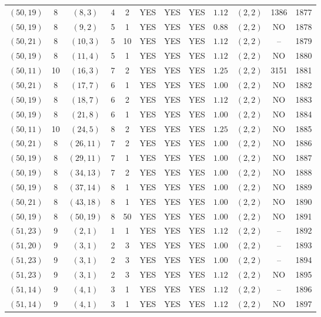 \begin{longtable}{|c|c|c|c|c|c|c|c|c|c|c|c|}
$(50,19)$ & 8 & $(8,3)$ & 4 & 2 & YES & YES & YES & $1.12$ & $(2,2)$ & 1386 & 1877\\
$(50,19)$ & 8 & $(9,2)$ & 5 & 1 & YES & YES & YES & $0.88$ & $(2,2)$ & NO & 1878\\
$(50,21)$ & 8 & $(10,3)$ & 5 & 10 & YES & YES & YES & $1.12$ & $(2,2)$ & -- & 1879\\
$(50,19)$ & 8 & $(11,4)$ & 5 & 1 & YES & YES & YES & $1.12$ & $(2,2)$ & NO & 1880\\
$(50,11)$ & 10 & $(16,3)$ & 7 & 2 & YES & YES & YES & $1.25$ & $(2,2)$ & 3151 & 1881\\
$(50,21)$ & 8 & $(17,7)$ & 6 & 1 & YES & YES & YES & $1.00$ & $(2,2)$ & NO & 1882\\
$(50,19)$ & 8 & $(18,7)$ & 6 & 2 & YES & YES & YES & $1.12$ & $(2,2)$ & NO & 1883\\
$(50,19)$ & 8 & $(21,8)$ & 6 & 1 & YES & YES & YES & $1.00$ & $(2,2)$ & NO & 1884\\
$(50,11)$ & 10 & $(24,5)$ & 8 & 2 & YES & YES & YES & $1.25$ & $(2,2)$ & NO & 1885\\
$(50,21)$ & 8 & $(26,11)$ & 7 & 2 & YES & YES & YES & $1.00$ & $(2,2)$ & NO & 1886\\
$(50,19)$ & 8 & $(29,11)$ & 7 & 1 & YES & YES & YES & $1.00$ & $(2,2)$ & NO & 1887\\
$(50,19)$ & 8 & $(34,13)$ & 7 & 2 & YES & YES & YES & $1.00$ & $(2,2)$ & NO & 1888\\
$(50,19)$ & 8 & $(37,14)$ & 8 & 1 & YES & YES & YES & $1.00$ & $(2,2)$ & NO & 1889\\
$(50,21)$ & 8 & $(43,18)$ & 8 & 1 & YES & YES & YES & $1.00$ & $(2,2)$ & NO & 1890\\
$(50,19)$ & 8 & $(50,19)$ & 8 & 50 & YES & YES & YES & $1.00$ & $(2,2)$ & NO & 1891\\
$(51,23)$ & 9 & $(2,1)$ & 1 & 1 & YES & YES & YES & $1.12$ & $(2,2)$ & -- & 1892\\
$(51,20)$ & 9 & $(3,1)$ & 2 & 3 & YES & YES & YES & $1.00$ & $(2,2)$ & -- & 1893\\
$(51,23)$ & 9 & $(3,1)$ & 2 & 3 & YES & YES & YES & $1.00$ & $(2,2)$ & -- & 1894\\
$(51,23)$ & 9 & $(3,1)$ & 2 & 3 & YES & YES & YES & $1.12$ & $(2,2)$ & NO & 1895\\
$(51,14)$ & 9 & $(4,1)$ & 3 & 1 & YES & YES & YES & $1.12$ & $(2,2)$ & -- & 1896\\
$(51,14)$ & 9 & $(4,1)$ & 3 & 1 & YES & YES & YES & $1.12$ & $(2,2)$ & NO & 1897\\

\end{longtable}
